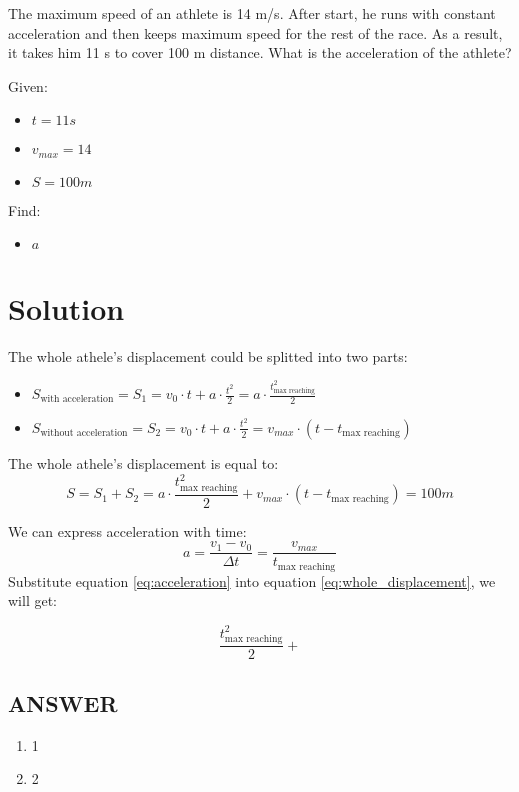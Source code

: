 
The maximum speed of an athlete is 14 m/s. After start, he runs with constant acceleration and
then keeps maximum speed for the rest of the race. As a result, it takes him 11 s to cover 100 m
distance. What is the acceleration of the athlete?

\bigbreak Given:

\begin{itemize}
    \item $t = 11s$
    \item $v_{max} = 14$
    \item $S = 100m$
\end{itemize}

\bigbreak Find:

\begin{itemize}
    \item $a$
\end{itemize}

\section*{Solution}

The whole athele's displacement could be splitted into two parts:

\begin{itemize}
    \item $S_{\text{with acceleration}} = S_1 = v_0 \cdot t + a \cdot \frac{t^2}{2} = a \cdot \frac{t_{\text{max reaching}}^2}{2}$
    \item $ S_{\text{without acceleration}} = S_2 = v_0 \cdot t + a \cdot \frac{t^2}{2} = v_{max} \cdot (t - t_{\text{max reaching}})$
\end{itemize}

The whole athele's displacement is equal to:
\begin{equation}
    \label{eq:whole_displacement}
    S = S_1 + S_2 = a \cdot \frac{t_{\text{max reaching}}^2}{2} + v_{max} \cdot (t - t_{\text{max reaching}}) = 100m
\end{equation}

We can express acceleration with time:
\begin{equation}
    \label{eq:acceleration}
    a = \frac{v_1 - v_0}{\Delta t} = \frac{v_{max}}{t_{\text{max reaching}}}
\end{equation}
Substitute equation \ref{eq:acceleration} into equation \ref{eq:whole_displacement}, we will get:

$$\frac{t_{\text{max reaching}}^2}{2} + $$


\vfill \subsection*{ANSWER}
\begin{enumerate}
    \item 1
    \item 2
\end{enumerate}
